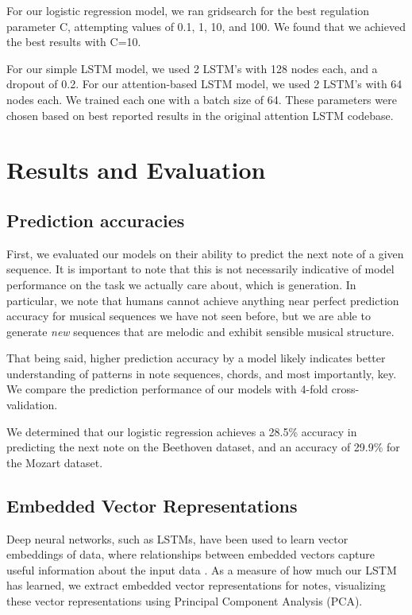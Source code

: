 \documentclass[twoside,twocolumn]{article}
\begin{document}
For our logistic regression model, we ran gridsearch for the best regulation parameter C, attempting values of 0.1, 1, 10, and 100. We found that we achieved the best results with C=10.

For our simple LSTM model, we used 2 LSTM's with 128 nodes each, and a dropout of 0.2. For our attention-based LSTM model, we used 2 LSTM's with 64 nodes each. We trained each one with a batch size of 64. These parameters were chosen based on best reported results in the original attention LSTM codebase.



\section{Results and Evaluation}

\subsection{Prediction accuracies}
First, we evaluated our models on their ability to predict the next note of a given sequence. It is important to note that this is not necessarily indicative of model performance on the task we actually care about, which is generation. In particular, we note that humans cannot achieve anything near perfect prediction accuracy for musical sequences we have not seen before, but we are able to generate \textit{new} sequences that are melodic and exhibit sensible musical structure.

That being said, higher prediction accuracy by a model likely indicates better understanding of patterns in note sequences, chords, and most importantly, key. We compare the prediction performance of our models with 4-fold cross-validation.

We determined that our logistic regression achieves a 28.5\% accuracy  in predicting the next note on the Beethoven dataset, and an accuracy of 29.9\% for the Mozart dataset. \\

\subsection{Embedded Vector Representations}

Deep neural networks, such as LSTMs, have been used to learn vector embeddings of data, where relationships between embedded vectors capture useful information about the input data \cite{huang-wu}. As a measure of how much our LSTM has learned, we extract embedded vector representations for notes, visualizing these vector representations using Principal Component Analysis (PCA).
\end{document}

